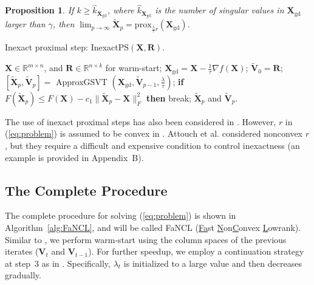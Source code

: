 \documentclass[10pt,journal,compsoc]{IEEEtran}
\newtheorem{prop}[theorem]{Proposition}
\def \R{\mathbb R}
\def\etal{et al.\;}
\newcommand{\X}{\mathbf{X}}
\newcommand{\NM}[2]{\| #1 \|_{#2} }
\newcommand{\Prox}[2]{\text{prox}_{#1}(#2)}
\begin{document}
\begin{prop}
\label{pr:apprGSVT}
If $k \ge \hat{k}_{\X_{\text{gd}}}$,
where $\hat{k}_{\X_{\text{gd}}}$ is the number of singular values in $\X_{\text{gd}}$ larger than $\gamma$,
then
$\lim_{p \rightarrow \infty} \tilde{\mathbf{X}}_p = \Prox{\frac{\lambda}{\tau} r}{\X_{\text{gd}}}$.
\end{prop}

\begin{algorithm}[ht]
\caption{Inexact proximal step: \textsf{InexactPS}$(\mathbf{X}, \mathbf{R})$.}
\begin{algorithmic}[1]
	\REQUIRE $\mathbf{X} \in \R^{m \times n}$, and $\mathbf{R} \in \R^{n \times k}$ for warm-start;
	\STATE $\X_{\text{gd}} = \mathbf{X} - \frac{1}{\tau} \nabla f(\mathbf{X})$;
	\STATE $\tilde{\mathbf{V}}_0 = \mathbf{R}$;
	\STATE $[ \tilde{\mathbf{X}}_p, \tilde{\mathbf{V}}_p ]  = $
	\textsf{ApproxGSVT}
	$( \X_{\text{gd}}, \tilde{\mathbf{V}}_{p - 1}, \frac{\lambda}{\tau} )$;
	\STATE \textbf{if} $F( \tilde{\mathbf{X}}_p ) \le F(\mathbf{X}) - c_1 \NM{\tilde{\mathbf{X}}_p - \mathbf{X}}{F}^2$
	\textbf{then} break;
	\ENDFOR
	\RETURN 
	$\tilde{\mathbf{X}}_p$ and $\tilde{\mathbf{V}}_p$.
\end{algorithmic}
\label{alg:inexactPS}
\end{algorithm}

The use of inexact proximal steps has also been considered in \cite{attouch2013convergence,schmidt2011convergence}.  
However, $r$ 
in (\ref{eq:problem})
is assumed to be convex in \cite{schmidt2011convergence}.
Attouch \etal \cite{attouch2013convergence} considered nonconvex $r$, but they
	require a difficult and expensive condition to control inexactness
	(an example is provided in Appendix~B).


\subsection{The Complete Procedure}
\label{sec:complete}

The complete procedure  
for solving (\ref{eq:problem})
is shown in Algorithm~\ref{alg:FaNCL},
and will be called  
FaNCL (\underline{Fa}st \underline{N}on\underline{C}onvex \underline{L}owrank).
Similar to \cite{hsieh2014nuclear,quan2015impute}, we perform warm-start 
using the column spaces of the previous iterates ($\mathbf{V}_{t}$ and $\mathbf{V}_{t - 1}$).
For further speedup, 
we employ a continuation strategy at step~3 as in \cite{mazumder2010spectral,lu2016nonconvex,toh2010accelerated}.
Specifically,
$\lambda_t$ is initialized to a large value
and then
decreases
gradually.
\end{document}
